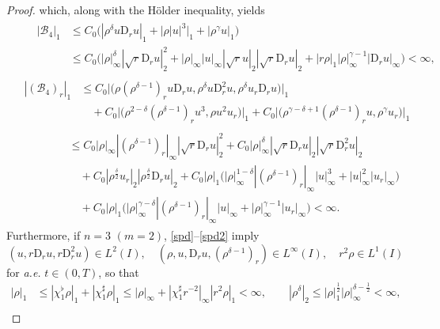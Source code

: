 \documentclass[11pt,reqno]{amsart}
\numberwithin{rk}{section}
\numberwithin{prop}{section}
\numberwithin{mydef}{section}
\numberwithin{lem}{section}
\numberwithin{equation}{section}
\numberwithin{thm}{section}
\begin{document}
\begin{proof}
which, along with the H\"older inequality, yields 
\begin{align*}
&\quad \,\begin{aligned}
|\mathcal{B}_4|_1 &\leq  C_0\big(|\rho^\delta u\mathrm{D}_r u|_1+\big|\rho |u|^{3}\big|_1+|\rho^\gamma u|_1\big)\\
&\leq C_0\big(|\rho|_\infty^\delta |\sqrt{r}\mathrm{D}_r u|_2^2+|\rho|_\infty|u|_\infty|\sqrt{r}u|_2 |\sqrt{r}\mathrm{D}_r u|_2+|r\rho|_1|\rho|_\infty^{\gamma-1} |\mathrm{D}_r u|_\infty\big)<\infty,
\end{aligned}\\[1mm]
&\begin{aligned}
|(\mathcal{B}_4)_r|_1&\leq C_0\big|\big(\rho(\rho^{\delta-1})_ru\mathrm{D}_r u,\rho^\delta u\mathrm{D}_r^2 u,\rho^\delta u_r\mathrm{D}_r u\big)\big|_1\\
&\quad +C_0\big|\big(\rho^{2-\delta}(\rho^{\delta-1})_r u^3,\rho u^2u_r\big)\big|_1 + C_0\big|\big(\rho^{\gamma-\delta+1}(\rho^{\delta-1})_r u,\rho^{\gamma} u_r\big)\big|_1
\end{aligned}\\
&\qquad\quad \ \begin{aligned}
&\leq C_0|\rho|_\infty|(\rho^{\delta-1})_r|_\infty|\sqrt{r}\mathrm{D}_r u|_2^2+C_0|\rho|_\infty^\delta  |\sqrt{r}\mathrm{D}_r u|_2|\sqrt{r}\mathrm{D}_r^2 u|_2\\
&\quad +C_0|\rho^\frac{\delta}{2}u_r|_2 |\rho^\frac{\delta}{2}\mathrm{D}_r u|_2+C_0|\rho|_1\big(|\rho|_\infty^{1-\delta}|(\rho^{\delta-1})_r|_\infty|u|_\infty^3+|u|_\infty^2|u_r|_\infty\big)\\
&\quad+C_0|\rho|_1\big(|\rho|_\infty^{\gamma-\delta}|(\rho^{\delta-1})_r|_\infty|u|_\infty+|\rho|_\infty^{\gamma-1}|u_r|_\infty\big)<\infty.
\end{aligned}
\end{align*}
Furthermore, if $n=3$ $(m=2)$, \eqref{spd}--\eqref{spd2}  imply
\begin{equation*}
(u,r\mathrm{D}_r u,r\mathrm{D}_r^2 u)\in L^2(I),\quad (\rho,u,\mathrm{D}_r u,(\rho^{\delta-1})_r )\in L^\infty(I),
\quad r^2\rho\in L^1(I) 
\end{equation*}
for {\it a.e.} $t\in (0,T)$, so that
\begin{equation*}
\begin{aligned}
|\rho|_1&\leq |\chi_1^\flat\rho|_1+|\chi_1^\sharp\rho|_1\leq |\rho|_\infty+ |\chi_1^\sharp r^{-2}|_\infty |r^2\rho|_1<\infty,\qquad |\rho^\delta|_{2}\leq |\rho|_1^\frac{1}{2}|\rho|_\infty^{\delta-\frac{1}{2}}<\infty,\\

\end{aligned}
\end{equation*}
\end{proof}
\end{document}
